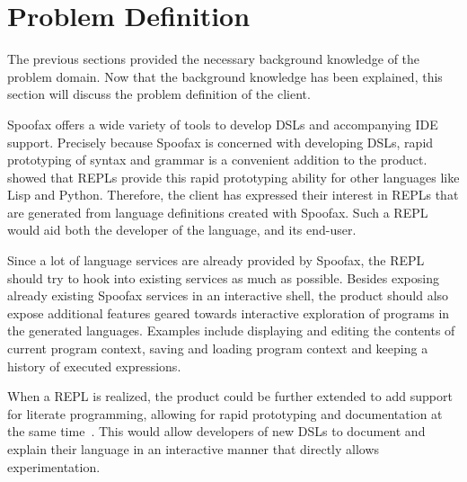 \section{Problem Definition}
\label{sec:problem-definition}

The previous sections provided the necessary background knowledge of
the problem domain. Now that the background knowledge has been
explained, this section will discuss the problem definition of the
client.

Spoofax offers a wide variety of tools to develop DSLs and
accompanying IDE support. Precisely because Spoofax is concerned with
developing DSLs, rapid prototyping of syntax and grammar is a
convenient addition to the product.  showed
that REPLs provide this rapid prototyping ability for other
languages like Lisp and Python. Therefore, the client has expressed
their interest in REPLs that are generated from language definitions
created with Spoofax. Such a REPL would aid both the developer of the
language, and its end-user.

Since a lot of language services are already provided by Spoofax, the
REPL should try to hook into existing services as much as possible.
Besides exposing already existing Spoofax services in an interactive
shell, the product should also expose additional features geared
towards interactive exploration of programs in the generated
languages.  Examples include displaying and editing the contents of
current program context, saving and loading program context and
keeping a history of executed expressions.

When a REPL is realized, the product could be further extended to add
support for literate programming, allowing for rapid prototyping and
documentation at the same time~\cite{schulte2012}. This would allow
developers of new DSLs to document and explain their language in an
interactive manner that directly allows experimentation.

